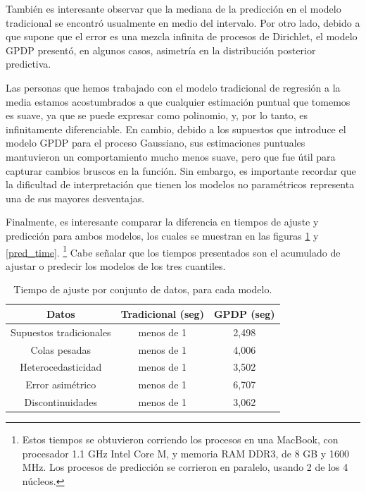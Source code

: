 Tambi\'en es interesante observar que la mediana de la predicci\'on en el modelo tradicional se encontr\'o usualmente en medio del intervalo. Por otro lado, debido a que supone que el error es una mezcla infinita de procesos de Dirichlet, el modelo GPDP present\'o, en algunos casos, asimetr\'ia en la distribuci\'on posterior predictiva.

Las personas que hemos trabajado con el modelo tradicional de regresi\'on a la media estamos acostumbrados a que cualquier estimaci\'on puntual que tomemos es suave, ya que se puede expresar como polinomio, y, por lo tanto, es infinitamente diferenciable. En cambio, debido a los supuestos que introduce el modelo GPDP para el proceso Gaussiano, sus estimaciones puntuales mantuvieron un comportamiento mucho menos suave, pero que fue \'util para capturar cambios bruscos en la funci\'on. Sin embargo, es importante recordar que la dificultad de interpretaci\'on que tienen los modelos no param\'etricos representa una de sus mayores desventajas.

Finalmente, es interesante comparar la diferencia en tiempos de ajuste y predicci\'on para ambos modelos, los cuales se muestran en las figuras \ref{fit_time} y \ref{pred_time}. \footnote{Estos tiempos se obtuvieron corriendo los procesos en una MacBook, con procesador 1.1 GHz Intel Core M, y memoria RAM DDR3, de 8 GB y 1600 MHz. Los procesos de predicci\'on se corrieron en paralelo, usando 2 de los 4 núcleos.} Cabe señalar que los tiempos presentados son el acumulado de ajustar o predecir los modelos de los tres cuantiles.

\begin{table}[H]
\centering
\caption{Tiempo de ajuste por conjunto de datos, para cada modelo.} 
\begin{tabular}{ccc}
  \hline
Datos & Tradicional (seg) & GPDP (seg) \\ 
  \hline
Supuestos tradicionales & menos de 1 & 2,498 \\ 
  Colas pesadas & menos de 1 & 4,006 \\ 
  Heterocedasticidad & menos de 1 & 3,502 \\ 
  Error asimétrico & menos de 1 & 6,707 \\ 
  Discontinuidades & menos de 1 & 3,062 \\ 
   \hline
\end{tabular}
\label{fit_time}
\end{table}

